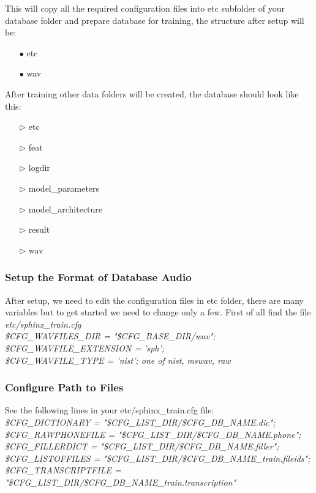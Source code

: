 \documentclass[12pt,a4paper,oldfontcommands]{memoir}
\begin{document}
This will copy all the required configuration files into etc subfolder of your database folder and prepare database for training, the structure after setup will be: 
\begin{itemize}
  \item[$\bullet$] etc
  \item[$\bullet$] wav
\end{itemize}

After training other data folders will be created, the database should look like this: 

\begin{itemize}
	
  \item[$\triangleright$] etc
  \item[$\triangleright$] feat 
  \item[$\triangleright$] logdir
  \item[$\triangleright$]model\_parameters
  \item[$\triangleright$]model\_architecture
  \item[$\triangleright$]result
  \item[$\triangleright$]wav
\end{itemize}


\subsubsection{Setup the Format of Database Audio}
After setup, we need to edit the configuration files in etc folder, there are many variables but to get started we need to change only a few. First of all find the file \textit{etc/sphinx\_train.cfg}\\
\textit{
\$CFG\_WAVFILES\_DIR = "\$CFG\_BASE\_DIR/wav";\\
\$CFG\_WAVFILE\_EXTENSION = 'sph';\\
\$CFG\_WAVFILE\_TYPE = 'nist';  one of nist, mswav, raw
}

\subsubsection{Configure Path to Files}
 See the following lines in your etc/sphinx\_train.cfg file:\\
\textit{ 
\$CFG\_DICTIONARY     = "\$CFG\_LIST\_DIR/\$CFG\_DB\_NAME.dic";\\
\$CFG\_RAWPHONEFILE   = "\$CFG\_LIST\_DIR/\$CFG\_DB\_NAME.phone";\\
\$CFG\_FILLERDICT     = "\$CFG\_LIST\_DIR/\$CFG\_DB\_NAME.filler";\\
\$CFG\_LISTOFFILES    = "\$CFG\_LIST\_DIR/\${CFG\_DB\_NAME}\_train.fileids";\\
\$CFG\_TRANSCRIPTFILE = "\$CFG\_LIST\_DIR/\${CFG\_DB\_NAME}\_train.transcription"
}
\end{document}
